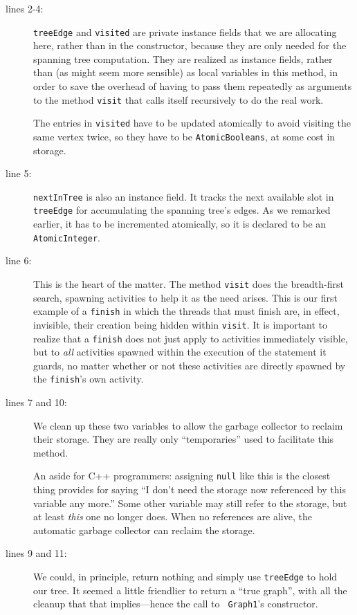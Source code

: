 \begin{description}
\item[lines 2-4:] {\tt treeEdge} and {\tt visited} are private instance fields that we
are allocating here, rather than in the constructor, because they are only
needed for the spanning tree computation. They are realized as instance fields,
rather than (as might seem more sensible) as local variables in this method,
in order to save the overhead of having to pass them repeatedly as arguments to the
method {\tt visit} that calls itself recursively to do the real work.

The entries in {\tt visited} have to be updated atomically to avoid visiting the
same vertex twice, so they have to be {\tt AtomicBooleans}, at some cost in
storage.
\item[line 5:] {\tt nextInTree} is also an instance field.  It tracks the next
available slot in {\tt tree\-Edge} for accumulating the spanning tree's edges.
As we remarked earlier, it has to be incremented atomically, so it is declared
to be an {\tt AtomicInteger}.
\item[line 6:] This is the heart of the matter.  The method {\tt visit} does the
breadth-first search, spawning activities to help it as the need arises.  This
is our first example of a {\tt finish} in which the threads that must finish
are, in effect, invisible, their creation being hidden within {\tt visit}.  It is
important to realize that a {\tt finish} does not just apply to activities
immediately visible, but to {\em all} activities spawned within the execution of
the statement it guards, no matter whether or not these activities are directly
spawned by the {\tt finish}'s own activity.
\item[lines 7 and 10:] We clean up these two variables to allow the garbage
collector to reclaim their storage.  They are really only ``temporaries'' used
to facilitate this method.  

An aside for C++ programmers: assigning {\tt null}
like this is the closest thing \Xten{} provides for saying ``I don't need the
storage now referenced by this variable any more.''  Some other variable may
still refer to the storage, but at least {\em this} one no longer does.  When no
references are alive, the automatic garbage collector can reclaim the storage.

\item[lines 9 and 11:] We could, in principle, return nothing and simply use
{\tt treeEdge} to hold our tree.  It seemed a little friendlier to return a
``true graph'', with all the cleanup that that implies---hence the call to {\tt
Graph1}'s constructor.
\end{description}

